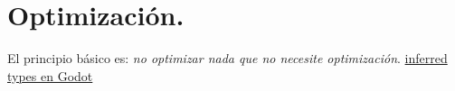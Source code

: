
\section{Optimización.}\label{optimizacion:optimizacion}

El principio básico es: \emph{no optimizar nada que no necesite optimización}.
\href{https://docs.godotengine.org/en/stable/getting_started/scripting/gdscript/gdscript_styleguide.html#inferred-types}{inferred types en Godot}